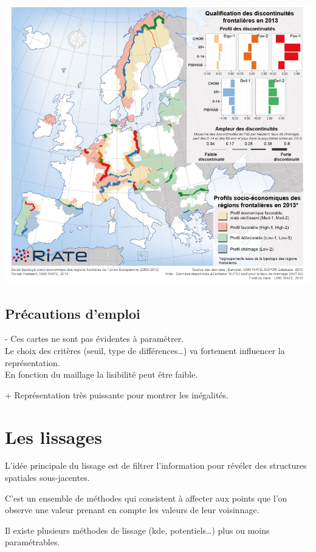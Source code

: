 \documentclass[]{book}
\begin{document}
\includegraphics{img/disc2.png}

\hypertarget{precautions-demploi-4}{%
\subsection{Précautions d'emploi}\label{precautions-demploi-4}}

- Ces cartes ne sont pas évidentes à paramétrer.\\
Le choix des critères (seuil, type de différences\ldots{}) va fortement influencer la représentation.\\
En fonction du maillage la lisibilité peut être faible.

+ Représentation très puissante pour montrer les inégalités.

\hypertarget{les-lissages}{%
\section{Les lissages}\label{les-lissages}}

L'idée principale du lissage est de filtrer l'information pour révéler des structures spatiales sous-jacentes.

C'est un ensemble de méthodes qui consistent à affecter aux points que l'on observe une valeur prenant en compte les valeurs de leur voisinnage.

Il existe plusieurs méthodes de lissage (kde, potentiels\ldots{}) plus ou moins paramétrables.
\end{document}
